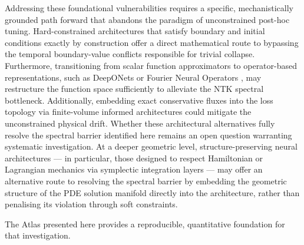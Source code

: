 Addressing these foundational vulnerabilities requires a specific, mechanistically grounded path forward that abandons the paradigm of unconstrained post-hoc tuning. Hard-constrained architectures that satisfy boundary and initial conditions exactly by construction \cite{Lagaris1998, Berg2018} offer a direct mathematical route to bypassing the temporal boundary-value conflicts responsible for trivial collapse. Furthermore, transitioning from scalar function approximators to operator-based representations, such as DeepONets \cite{Lu2021deeponet} or Fourier Neural Operators \cite{Li2021fno}, may restructure the function space sufficiently to alleviate the NTK spectral bottleneck. Additionally, embedding exact conservative fluxes into the loss topology via finite-volume informed architectures could mitigate the unconstrained physical drift. Whether these architectural alternatives fully resolve the spectral barrier identified here remains an open question warranting systematic investigation. At a deeper geometric level, structure-preserving neural architectures — in particular, those designed to respect Hamiltonian or Lagrangian mechanics via symplectic integration layers \cite{Chen2020symplectic, Matsubara2021} — may offer an alternative route to resolving the spectral barrier by embedding the geometric structure of the PDE solution manifold directly into the architecture, rather than penalising its violation through soft constraints.

The Atlas presented here provides a reproducible, quantitative foundation for that investigation.
